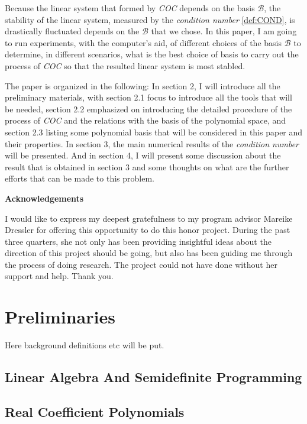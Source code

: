 \documentclass[12pt]{amsart}
\numberwithin{equation}{section}
\theoremstyle{definition}
\numberwithin{thm}{section}
\begin{document}
Because the linear system that formed by \emph{COC} depends on the basis $\mathcal{B}$,
the stability of the linear system, measured by the \emph{condition number} \ref{def:COND}, is drastically fluctuated depends on the $\mathcal{B}$ that we chose. 
In this paper, I am going to run experiments, with the computer's aid, of different choices of the basis $\mathcal{B}$ to determine, 
in different scenarios, what is the best choice of basis to carry out the process of \emph{COC} so that the resulted linear system is most stabled. 

The paper is organized in the following: In section 2, I will introduce all the preliminary materials, 
with section 2.1 focus to introduce all the tools that will be needed, 
section 2.2 emphasized on introducing the detailed procedure of the process of \emph{COC} and the relations with the basis of the polynomial space,
and section 2.3 listing some polynomial basis that will be considered in this paper and their properties. 
In section 3, the main numerical results of the \emph{condition number} will be presented. 
And in section 4, I will present some discussion about the result that is obtained in section 3 and some thoughts on what are the further efforts that can be made to this problem.

\newpage

\centerline{\textbf{Acknowledgements}}

I would like to express my deepest gratefulness to my program advisor Mareike Dressler for offering this opportunity to do this honor project. 
During the past three quarters, she not only has been providing insightful ideas about the direction of this project should be going, 
but also has been guiding me through the process of doing research. The project could not have done without her support and help. Thank you.

\newpage

\section{Preliminaries}
\label{Sec:Preliminaries}

Here background definitions etc will be put. 

\subsection{Linear Algebra And Semidefinite Programming}
\label{Sec:Linear Algebra}

\subsection{Real Coefficient Polynomials}
\label{Sec:Real Coefficient Polynomials}
\end{document}
